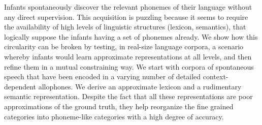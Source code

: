 Infants spontaneously discover the relevant phonemes of their language without any direct supervision. This acquisition is puzzling because it seems to require the availability of high levels of linguistic structures (lexicon, semantics), that logically suppose the infants having a set of phonemes already. We show how this circularity can be broken by testing, in real-size language corpora, a scenario whereby infants would learn approximate representations at all levels, and then refine them in a mutual constraining way. We start with corpora of spontaneous speech that have been encoded in a varying number of detailed context-dependent allophones. We derive an approximate lexicon and a rudimentary semantic representation. Despite the fact that all these representations are poor approximations of the ground truth, they help reorganize the fine grained categories into phoneme-like categories with a high degree of accuracy.
